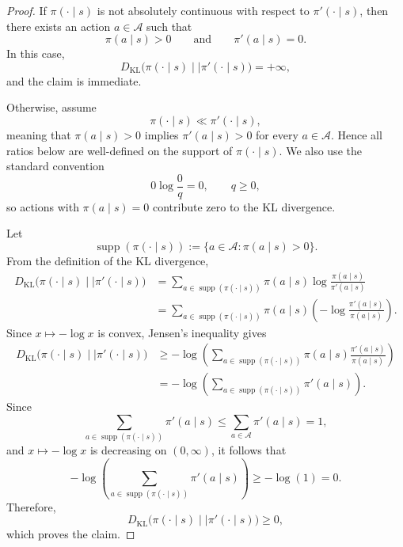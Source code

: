 \documentclass[11pt]{article}
\begin{document}
\begin{proof}
If $\pi(\cdot\mid s)$ is not absolutely continuous with respect to $\pi'(\cdot\mid s)$, then
there exists an action $a\in\mathcal A$ such that
\[
\pi(a\mid s)>0
\qquad\text{and}\qquad
\pi'(a\mid s)=0.
\]
In this case,
\[
D_{\mathrm{KL}}\big(\pi(\cdot\mid s)\mid\mid\pi'(\cdot\mid s)\big)=+\infty,
\]
and the claim is immediate.

Otherwise, assume
\[
\pi(\cdot\mid s)\ll \pi'(\cdot\mid s),
\]
meaning that $\pi(a\mid s)>0$ implies $\pi'(a\mid s)>0$ for every $a\in\mathcal A$. Hence all
ratios below are well-defined on the support of $\pi(\cdot\mid s)$. We also use the standard
convention
\[
0\log\frac{0}{q}=0,
\qquad q\ge0,
\]
so actions with $\pi(a\mid s)=0$ contribute zero to the KL divergence.

Let
\[
\operatorname{supp}(\pi(\cdot\mid s))
:=
\{a\in\mathcal A:\pi(a\mid s)>0\}.
\]
From the definition of the KL divergence,
\begin{align*}
D_{\mathrm{KL}}\big(\pi(\cdot\mid s)\mid\mid\pi'(\cdot\mid s)\big)
&=
\sum_{a\in \operatorname{supp}(\pi(\cdot\mid s))}
\pi(a\mid s)
\log\frac{\pi(a\mid s)}{\pi'(a\mid s)} \\
&=
\sum_{a\in \operatorname{supp}(\pi(\cdot\mid s))}
\pi(a\mid s)
\left(
-\log\frac{\pi'(a\mid s)}{\pi(a\mid s)}
\right).
\end{align*}
Since $x\mapsto-\log x$ is convex, Jensen's inequality gives
\begin{align*}
D_{\mathrm{KL}}\big(\pi(\cdot\mid s)\mid\mid\pi'(\cdot\mid s)\big)
&\ge
-\log\left(
\sum_{a\in \operatorname{supp}(\pi(\cdot\mid s))}
\pi(a\mid s)
\frac{\pi'(a\mid s)}{\pi(a\mid s)}
\right) \\
&=
-\log\left(
\sum_{a\in \operatorname{supp}(\pi(\cdot\mid s))}
\pi'(a\mid s)
\right).
\end{align*}
Since
\[
\sum_{a\in \operatorname{supp}(\pi(\cdot\mid s))}
\pi'(a\mid s)
\le
\sum_{a\in\mathcal A}\pi'(a\mid s)
=
1,
\]
and $x\mapsto-\log x$ is decreasing on $(0,\infty)$, it follows that
\[
-\log\left(
\sum_{a\in \operatorname{supp}(\pi(\cdot\mid s))}
\pi'(a\mid s)
\right)
\ge
-\log(1)
=
0.
\]
Therefore,
\[
D_{\mathrm{KL}}\big(\pi(\cdot\mid s)\mid\mid\pi'(\cdot\mid s)\big)\ge0,
\]
which proves the claim.
\end{proof}
\end{document}
